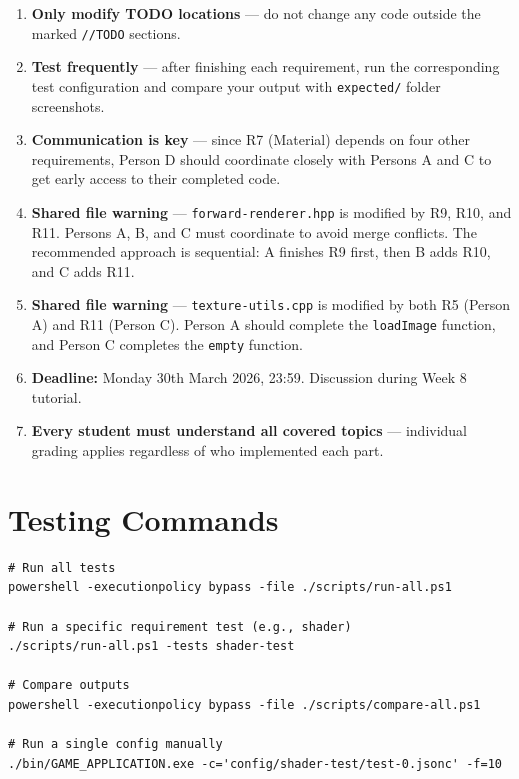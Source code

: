 \documentclass[12pt,a4paper]{article}
\begin{document}
\begin{enumerate}
  \item \textbf{Only modify TODO locations} --- do not change any code outside the marked \texttt{//TODO} sections.

  \item \textbf{Test frequently} --- after finishing each requirement, run the corresponding test configuration and compare your output with \texttt{expected/} folder screenshots.

  \item \textbf{Communication is key} --- since R7 (Material) depends on four other requirements, Person D should coordinate closely with Persons A and C to get early access to their completed code.

  \item \textbf{Shared file warning} --- \texttt{forward-renderer.hpp} is modified by R9, R10, and R11. Persons A, B, and C must coordinate to avoid merge conflicts. The recommended approach is sequential: A finishes R9 first, then B adds R10, and C adds R11.

  \item \textbf{Shared file warning} --- \texttt{texture-utils.cpp} is modified by both R5 (Person A) and R11 (Person C). Person A should complete the \texttt{loadImage} function, and Person C completes the \texttt{empty} function.

  \item \textbf{Deadline:} Monday 30th March 2026, 23:59. Discussion during Week 8 tutorial.

  \item \textbf{Every student must understand all covered topics} --- individual grading applies regardless of who implemented each part.
\end{enumerate}

\section{Testing Commands}

\begin{tcolorbox}[colback=black!3, colframe=black!50, title=\textbf{Running Tests}]
\begin{verbatim}
# Run all tests
powershell -executionpolicy bypass -file ./scripts/run-all.ps1

# Run a specific requirement test (e.g., shader)
./scripts/run-all.ps1 -tests shader-test

# Compare outputs
powershell -executionpolicy bypass -file ./scripts/compare-all.ps1

# Run a single config manually
./bin/GAME_APPLICATION.exe -c='config/shader-test/test-0.jsonc' -f=10
\end{verbatim}
\end{tcolorbox}
\end{document}
